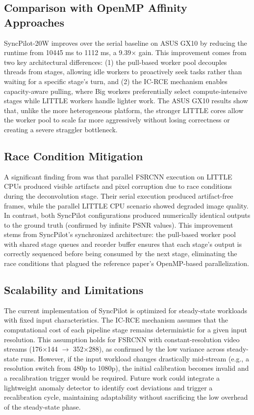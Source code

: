 \documentclass[runningheads]{llncs}
\begin{document}
\subsection{Comparison with OpenMP Affinity Approaches}
SyncPilot-20W improves over the serial baseline on ASUS GX10 by reducing the runtime from 10445 ms to 1112 ms, a 9.39$\times$ gain. This improvement comes from two key architectural differences: (1) the pull-based worker pool decouples threads from stages, allowing idle workers to proactively seek tasks rather than waiting for a specific stage's turn, and (2) the IC-RCE mechanism enables capacity-aware pulling, where Big workers preferentially select compute-intensive stages while LITTLE workers handle lighter work. The ASUS GX10 results show that, unlike the more heterogeneous platform, the stronger LITTLE cores allow the worker pool to scale far more aggressively without losing correctness or creating a severe straggler bottleneck.

\subsection{Race Condition Mitigation}
A significant finding from \cite{annisa2025fsrcnn} was that parallel FSRCNN execution on LITTLE CPUs produced visible artifacts and pixel corruption due to race conditions during the deconvolution stage. Their serial execution produced artifact-free frames, while the parallel LITTLE CPU scenario showed degraded image quality. In contrast, both SyncPilot configurations produced numerically identical outputs to the ground truth (confirmed by infinite PSNR values). This improvement stems from SyncPilot's synchronized architecture: the pull-based worker pool with shared stage queues and reorder buffer ensures that each stage's output is correctly sequenced before being consumed by the next stage, eliminating the race conditions that plagued the reference paper's OpenMP-based parallelization.

\subsection{Scalability and Limitations}
The current implementation of SyncPilot is optimized for steady-state workloads with fixed input characteristics. The IC-RCE mechanism assumes that the computational cost of each pipeline stage remains deterministic for a given input resolution. This assumption holds for FSRCNN with constant-resolution video streams (176$\times$144 $\rightarrow$ 352$\times$288), as confirmed by the low variance across steady-state runs. However, if the input workload changes drastically mid-stream (e.g., a resolution switch from 480p to 1080p), the initial calibration becomes invalid and a recalibration trigger would be required. Future work could integrate a lightweight anomaly detector to identify cost deviations and trigger a recalibration cycle, maintaining adaptability without sacrificing the low overhead of the steady-state phase.
\end{document}
